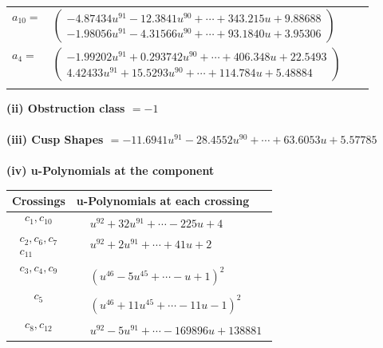 \documentclass[1p]{elsarticle_modified}
\theoremstyle{definition}
\begin{document}
\begin{tabular}{m{7pt} m{180pt} m{7pt} m{180pt} }
\flushright $a_{10}=$&$\begin{pmatrix}-4.87434 u^{91}-12.3841 u^{90}+\cdots+343.215 u+9.88688\\-1.98056 u^{91}-4.31566 u^{90}+\cdots+93.1840 u+3.95306\end{pmatrix}$ \\
\flushright $a_{4}=$&$\begin{pmatrix}-1.99202 u^{91}+0.293742 u^{90}+\cdots+406.348 u+22.5493\\4.42433 u^{91}+15.5293 u^{90}+\cdots+114.784 u+5.48884\end{pmatrix}$\\&\end{tabular}
\flushleft \textbf{(ii) Obstruction class $= -1$}\\~\\
\flushleft \textbf{(iii) Cusp Shapes $= -11.6941 u^{91}-28.4552 u^{90}+\cdots+63.6053 u+5.57785$}\\~\\
\newpage\renewcommand{\arraystretch}{1}
\flushleft \textbf{(iv) u-Polynomials at the component}\newline \\
\begin{tabular}{m{50pt}|m{274pt}}
Crossings & \hspace{64pt}u-Polynomials at each crossing \\
\hline $$\begin{aligned}c_{1},c_{10}\end{aligned}$$&$\begin{aligned}
&u^{92}+32 u^{91}+\cdots-225 u+4
\end{aligned}$\\
\hline $$\begin{aligned}c_{2},c_{6},c_{7}\\c_{11}\end{aligned}$$&$\begin{aligned}
&u^{92}+2 u^{91}+\cdots+41 u+2
\end{aligned}$\\
\hline $$\begin{aligned}c_{3},c_{4},c_{9}\end{aligned}$$&$\begin{aligned}
&(u^{46}-5 u^{45}+\cdots- u+1)^{2}
\end{aligned}$\\
\hline $$\begin{aligned}c_{5}\end{aligned}$$&$\begin{aligned}
&(u^{46}+11 u^{45}+\cdots-11 u-1)^{2}
\end{aligned}$\\
\hline $$\begin{aligned}c_{8},c_{12}\end{aligned}$$&$\begin{aligned}
&u^{92}-5 u^{91}+\cdots-169896 u+138881
\end{aligned}$\\
\hline
\end{tabular}\\~\\
\end{document}
